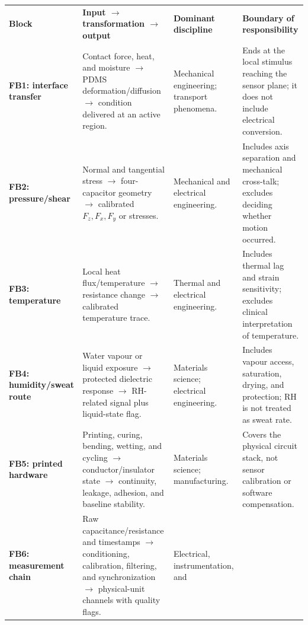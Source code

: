 \vspace{0.45em}
\begingroup
\fontsize{7.75}{9.1}\selectfont
\setlength{\tabcolsep}{2.5pt}
\renewcommand{\arraystretch}{1.12}
\begin{tabularx}{\linewidth}{>{\raggedright\arraybackslash\bfseries\color{AUBRed}}p{2.75cm}
                            >{\raggedright\arraybackslash}p{5.55cm}
                            >{\raggedright\arraybackslash}p{3.15cm}Y}
\color{white}\textbf{Block} &
\color{white}\textbf{Input $\rightarrow$ transformation $\rightarrow$ output} &
\color{white}\textbf{Dominant discipline} &
\color{white}\textbf{Boundary of responsibility} \\
FB1: interface transfer & Contact force, heat, and moisture $\rightarrow$ PDMS
deformation/diffusion $\rightarrow$ condition delivered at an active region. &
Mechanical engineering; transport phenomena. & Ends at the local stimulus
reaching the sensor plane; it does not include electrical conversion. \\
FB2: pressure/shear & Normal and tangential stress $\rightarrow$ four-capacitor
geometry $\rightarrow$ calibrated $F_z,F_x,F_y$ or stresses. & Mechanical and
electrical engineering. & Includes axis separation and mechanical cross-talk;
excludes deciding whether motion occurred. \\
FB3: temperature & Local heat flux/temperature $\rightarrow$ resistance change
$\rightarrow$ calibrated temperature trace. & Thermal and electrical
engineering. & Includes thermal lag and strain sensitivity; excludes clinical
interpretation of temperature. \\
FB4: humidity/sweat route & Water vapour or liquid exposure $\rightarrow$
protected dielectric response $\rightarrow$ RH-related signal plus liquid-state
flag. & Materials science; electrical engineering. & Includes vapour access,
saturation, drying, and protection; RH is not treated as sweat rate. \\
FB5: printed hardware & Printing, curing, bending, wetting, and cycling
$\rightarrow$ conductor/insulator state $\rightarrow$ continuity, leakage,
adhesion, and baseline stability. & Materials science; manufacturing. & Covers
the physical circuit stack, not sensor calibration or software compensation. \\
FB6: measurement chain & Raw capacitance/resistance and timestamps $\rightarrow$
conditioning, calibration, filtering, and synchronization $\rightarrow$
physical-unit channels with quality flags. & Electrical, instrumentation, and

\end{tabularx}
